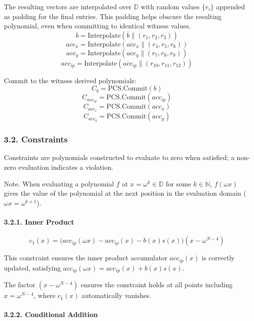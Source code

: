 \documentclass[
]{article}
\begin{document}
The resulting vectors are interpolated over \(\mathbb{D}\) with random
values \(\{r_i\}\) appended as padding for the final entries. This
padding helps obscure the resulting polynomial, even when committing to
identical witness values.
\[b = \text{Interpolate}(\overline{b} \| (r_1, r_2, r_3))\]
\[acc_x = \text{Interpolate}(\overline{acc}_x \| (r_4, r_5, r_6))\]
\[acc_y = \text{Interpolate}(\overline{acc}_y \| (r_7, r_8, r_9))\]
\[acc_{ip} = \text{Interpolate}(\overline{acc}_{ip} \| (r_{10}, r_{11}, r_{12}))\]

Commit to the witness derived polynomials:
\[C_b = \text{PCS.Commit}(b)\]
\[C_{acc_{ip}} = \text{PCS.Commit}(acc_{ip})\]
\[C_{acc_x} = \text{PCS.Commit}(acc_x)\]
\[C_{acc_y} = \text{PCS.Commit}(acc_y)\]

\hypertarget{constraints}{%
\subsubsection{3.2. Constraints}\label{constraints}}

Constraints are polynomials constructed to evaluate to zero when
satisfied; a non-zero evaluation indicates a violation.

Note. When evaluating a polynomial \(f\) at
\(x = \omega^k \in \mathbb{D}\) for some \(k \in \mathbb{N}\),
\(f(\omega x)\) gives the value of the polynomial at the next position
in the evaluation domain (\(\omega x = \omega^{k+1}\)).

\hypertarget{inner-product}{%
\paragraph{3.2.1. Inner Product}\label{inner-product}}

\[
c_1(x) = \bigl(acc_{ip}(\omega x) - acc_{ip}(x) - b(x)s(x)\bigr)(x - \omega^{N-4})
\]

This constraint ensures the inner product accumulator \(acc_{ip}(x)\) is
correctly updated, satisfying
\(acc_{ip}(\omega x) = acc_{ip}(x) + b(x)s(x)\).

The factor \((x - \omega^{N-4})\) ensures the constraint holds at all
points including \(x = \omega^{N-4}\), where \(c_1(x)\) automatically
vanishes.

\hypertarget{conditional-addition}{%
\paragraph{3.2.2. Conditional Addition}\label{conditional-addition}}
\end{document}
